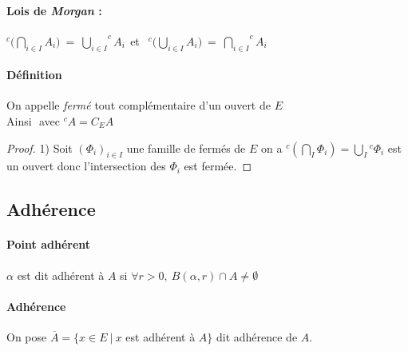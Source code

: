 		\medskip
		
		\paragraph{Lois de \emph{\emph{Morgan}} : }
			$^c\Big(\bigcap\limits_{i\in I} A_i \Big) ~=~ {\bigcup\limits_{i\in I}} ^cA_i ~~$et
			$~~ ^c\Big(\bigcup\limits_{i\in I} A_i \Big) ~=~ {\bigcap\limits_{i\in I}} ^cA_i$ 
			
		\traitd
		\paragraph{Définition}
			On appelle \emph{fermé} tout complémentaire d'un ouvert de $E$ \\
			Ainsi  ${}$ avec $^cA = C_E A$ 
		\trait
		
		
		\begin{proof}
		{\small 1)} Soit $\left( \Phi_i \right)_{i\in I}$ une famille de fermés de $E$ on a ${^c\left(\bigcap_I \Phi_i \right)} = 
		\bigcup_{I} {^c\Phi_i}$ est un ouvert donc l'intersection des $\Phi_i$ est fermée.
		\end{proof} \medskip
	
	\subsection{Adhérence}
	
		\traitd
		\paragraph{Point adhérent} $\alpha$ est dit adhérent à $A$ si $\forall r>0 ,~B(\alpha ,r) \cap A \neq \emptyset$ 
		\traitdouble
		\paragraph{Adhérence} On pose $\overline{A} = \{ x\in E ~\vert ~x$ est adhérent à $A\}$ dit adhérence de $A$. 
		\trait
		
		
		\newpage
		
